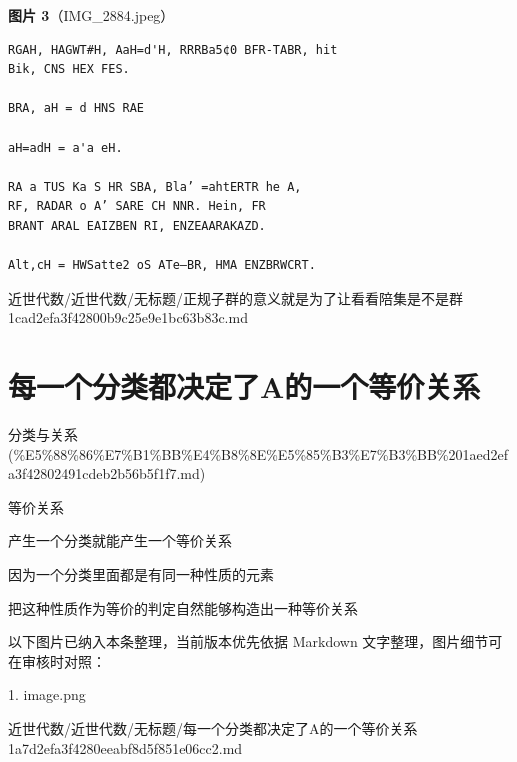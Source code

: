 \begin{note}
\textbf{图片 3}（IMG\_2884.jpeg）
\begin{Verbatim}[fontsize=\small]
RGAH, HAGWT#H, AaH=d'H, RRRBa5¢0 BFR-TABR, hit
Bik, CNS HEX FES.

BRA, aH = d HNS RAE

aH=adH = a'a eH.

RA a TUS Ka S HR SBA, Bla’ =ahtERTR he A,
RF, RADAR o A’ SARE CH NNR. Hein, FR
BRANT ARAL EAIZBEN RI, ENZEAARAKAZD.

Alt,cH = HWSatte2 oS ATe—BR, HMA ENZBRWCRT.
\end{Verbatim}

\end{note}

\begin{note}[来源路径]

近世代数/近世代数/无标题/正规子群的意义就是为了让看看陪集是不是群 1cad2efa3f42800b9c25e9e1bc63b83c.md

\end{note}

\section*{每一个分类都决定了A的一个等价关系}

\begin{note}[来源上级主题]

分类与关系 (\%E5\%88\%86\%E7\%B1\%BB\%E4\%B8\%8E\%E5\%85\%B3\%E7\%B3\%BB\%201aed2efa3f42802491cdeb2b56b5f1f7.md)

\end{note}

\begin{note}[每一个分类都决定了A的一个等价关系]

等价关系

产生一个分类就能产生一个等价关系

因为一个分类里面都是有同一种性质的元素

把这种性质作为等价的判定自然能够构造出一种等价关系

\end{note}

\begin{note}[关联图片]
以下图片已纳入本条整理，当前版本优先依据 Markdown 文字整理，图片细节可在审核时对照：

1. image.png\\

\end{note}

\begin{note}[来源路径]

近世代数/近世代数/无标题/每一个分类都决定了A的一个等价关系 1a7d2efa3f4280eeabf8d5f851e06cc2.md

\end{note}

